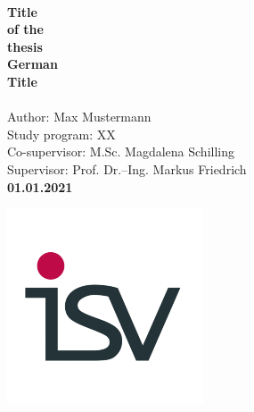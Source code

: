 %
%
\begin{titlepage}
\begin{flushright}
  \vspace{10mm} 
         {\large \bf \hspace{13mm} \\}
  \vspace{10mm}
         {\Large \bf \hspace{20mm}Title \\} 
         {\Large \bf \hspace{20mm}of the\\}
         {\Large \bf \hspace{20mm}thesis\\}
  \vspace{5mm}
         {\large \bf \hspace{20mm}German\\} 
         {\large \bf \hspace{20mm}Title\\} 
  \vspace{20mm}
         {\\} %
  \vspace{50mm}
  		 {\small Author: Max Mustermann}\\ %
  		 {\small Study program: XX}\\
  \vspace{10mm}
  		 {\small Co-supervisor: M.Sc. Magdalena Schilling}\\ %
  		 {\small Supervisor: Prof. Dr.--Ing. Markus Friedrich}\\ %
  \vspace{10mm}
         {\bf 01.01.2021}\\ %
  \vspace{20mm}
\end{flushright}
\begin{flushleft}
\begin{minipage}{0.2\textwidth}
	\begin{flushright}
	{\includegraphics[scale=0.35]{Pictures/ISV_logo_weiss.png}}\\

\end{flushright}
\end{minipage}
\end{flushleft}
\end{titlepage}
